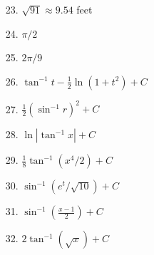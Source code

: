 \documentclass[12pt]{report}
\begin{document}
\begin{itemize}
\item[23.] $\sqrt{91}\approx 9.54$ feet
\item[24.] $\pi/2$
\item[25.] $2\pi/9$
\item[26.] $\tan^{-1}t -\frac12\ln(1+t^2)+C$
\item[27.] $\frac12\left(\sin^{-1}r\right)^2+C$
\item[28.] $\ln|\tan^{-1}x|+C$
\item[29.] $\frac18\tan^{-1}(x^4/2)+C$
\item[30.] $\sin^{-1}(e^t/\sqrt{10})+C$
\item[31.] $\sin^{-1}\left(\frac{x-1}2 \right)+C$
\item[32.] $2\tan^{-1}(\sqrt x)+C$
\end{itemize}
\end{document}
